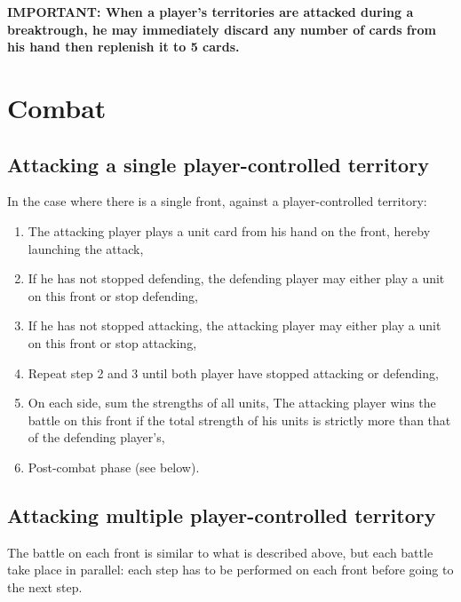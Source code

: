 \documentclass[a4paper]{article}
\begin{document}
    \hspace{-1.5em} \textbf{
    IMPORTANT: When a player's territories are attacked during a breaktrough, he may immediately
    discard any number of cards from his hand then replenish it to 5 cards.
    }


\section{Combat}

  \subsection{Attacking a single player-controlled territory}
  
    \hspace{-1.5em} In the case where there is a single front,
    against a player-controlled territory:
    \vspace{-1.3em}
    \begin{enumerate}
        \item The attacking player plays a unit card from his hand on the front,
        hereby launching the attack,
        \item If he has not stopped defending, the defending player may either play a unit on this front or stop defending,
        \item If he has not stopped attacking, the attacking player may either play a unit on this front or stop attacking,
        \item Repeat step 2 and 3 until both player have stopped attacking or defending,
        \item On each side, sum the strengths of all units,
        The attacking player wins the battle on this front if the total strength of his units
        is strictly more than that of the defending player's,
        \item Post-combat phase (see below).
    \end{enumerate}
    

  \subsection{Attacking multiple player-controlled territory}
    
    The battle on each front is similar to what is described above,
    but each battle take place in parallel:
    each step has to be performed on each front before going to the next step.
    
\end{document}
